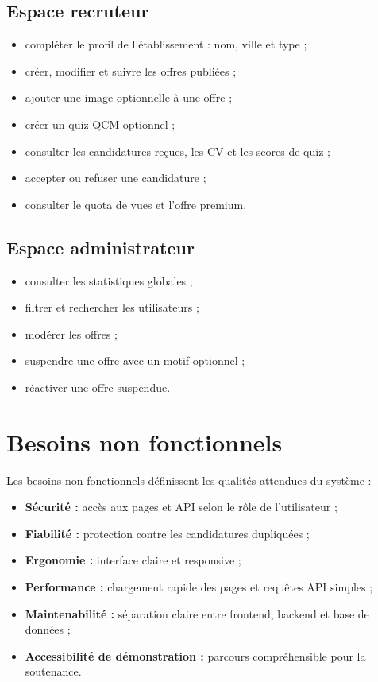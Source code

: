 \subsection{Espace recruteur}

\begin{itemize}
    \item compléter le profil de l'établissement : nom, ville et type ;
    \item créer, modifier et suivre les offres publiées ;
    \item ajouter une image optionnelle à une offre ;
    \item créer un quiz QCM optionnel ;
    \item consulter les candidatures reçues, les CV et les scores de quiz ;
    \item accepter ou refuser une candidature ;
    \item consulter le quota de vues et l'offre premium.
\end{itemize}

\subsection{Espace administrateur}

\begin{itemize}
    \item consulter les statistiques globales ;
    \item filtrer et rechercher les utilisateurs ;
    \item modérer les offres ;
    \item suspendre une offre avec un motif optionnel ;
    \item réactiver une offre suspendue.
\end{itemize}

\section{Besoins non fonctionnels}

\noindent
Les besoins non fonctionnels définissent les qualités attendues du système :

\begin{itemize}
    \item \textbf{Sécurité :} accès aux pages et API selon le rôle de l'utilisateur ;
    \item \textbf{Fiabilité :} protection contre les candidatures dupliquées ;
    \item \textbf{Ergonomie :} interface claire et responsive ;
    \item \textbf{Performance :} chargement rapide des pages et requêtes API simples ;
    \item \textbf{Maintenabilité :} séparation claire entre frontend, backend et base de données ;
    \item \textbf{Accessibilité de démonstration :} parcours compréhensible pour la soutenance.
\end{itemize}

